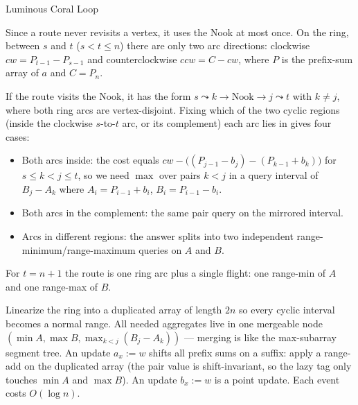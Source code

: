 \begin{tutorial}{Luminous Coral Loop}

Since a route never revisits a vertex, it uses the Nook at most once. On the ring, between $s$ and $t$ ($s < t \le n$) there are only two arc directions: clockwise $cw = P_{t-1} - P_{s-1}$ and counterclockwise $ccw = C - cw$, where $P$ is the prefix-sum array of $a$ and $C = P_n$.

If the route visits the Nook, it has the form $s \leadsto k \to \text{Nook} \to j \leadsto t$ with $k \neq j$, where both ring arcs are vertex-disjoint. Fixing which of the two cyclic regions (inside the clockwise $s$-to-$t$ arc, or its complement) each arc lies in gives four cases:

\begin{itemize}
\item Both arcs inside: the cost equals $cw - \bigl((P_{j-1} - b_j) - (P_{k-1} + b_k)\bigr)$ for $s \le k < j \le t$, so we need $\max$ over pairs $k < j$ in a query interval of $B_j - A_k$ where $A_i = P_{i-1} + b_i$, $B_i = P_{i-1} - b_i$.
\item Both arcs in the complement: the same pair query on the mirrored interval.
\item Arcs in different regions: the answer splits into two independent range-minimum/range-maximum queries on $A$ and $B$.
\end{itemize}

For $t = n+1$ the route is one ring arc plus a single flight: one range-min of $A$ and one range-max of $B$.

Linearize the ring into a duplicated array of length $2n$ so every cyclic interval becomes a normal range. All needed aggregates live in one mergeable node $(\min A, \max B, \max_{k<j}(B_j - A_k))$ --- merging is like the max-subarray segment tree. An update $a_x := w$ shifts all prefix sums on a suffix: apply a range-add on the duplicated array (the pair value is shift-invariant, so the lazy tag only touches $\min A$ and $\max B$). An update $b_x := w$ is a point update. Each event costs $O(\log n)$.


\end{tutorial}
